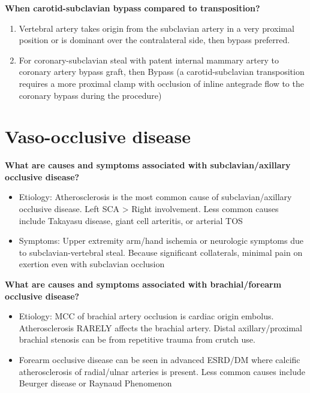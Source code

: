 \documentclass[
]{book}
\begin{document}
\textbf{When carotid-subclavian bypass compared to transposition?}~~

\begin{enumerate}
\def\labelenumi{\arabic{enumi}.}
\item
  Vertebral artery takes origin from the subclavian artery in a very
  proximal position or is dominant over the contralateral side, then
  bypass preferred. \citep{moraschTechniqueSubclavianCarotid2009d}
\item
  For coronary-subclavian steal with patent internal mammary artery to
  coronary artery bypass graft, then Bypass (a carotid-subclavian
  transposition requires a more proximal clamp with occlusion of
  inline antegrade flow to the coronary bypass during the procedure)
  \citep{cuaReviewCoronarySubclavian2017}
\end{enumerate}

\hypertarget{vaso-occlusive-disease}{%
\section{Vaso-occlusive disease}\label{vaso-occlusive-disease}}

\textbf{What are causes and symptoms associated with subclavian/axillary
occlusive disease?} \citep{jacklcronenwettVascularDecisionMaking2020}

\begin{itemize}
\item
  Etiology: Atherosclerosis is the most common cause of
  subclavian/axillary occlusive disease. Left SCA \textgreater{} Right involvement.
  Less common causes include Takayasu disease, giant cell arteritis,
  or arterial TOS
\item
  Symptoms: Upper extremity arm/hand ischemia or neurologic symptoms
  due to subclavian-vertebral steal. Because significant collaterals,
  minimal pain on exertion even with subclavian occlusion
\end{itemize}

\textbf{What are causes and symptoms associated with brachial/forearm
occlusive disease?}

\begin{itemize}
\item
  Etiology: MCC of brachial artery occlusion is cardiac origin
  embolus. Atherosclerosis RARELY affects the brachial artery. Distal
  axillary/proximal brachial stenosis can be from repetitive trauma
  from crutch use.~
\item
  Forearm occlusive disease can be seen in advanced ESRD/DM where
  calcific atherosclerosis of radial/ulnar arteries is present. Less
  common causes include Beurger disease or Raynaud Phenomenon~
\end{itemize}
\end{document}
